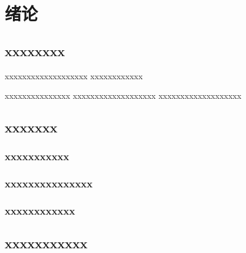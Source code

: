 
\chapter{绪\quad 论}
\section{xxxxxxxx}
xxxxxxxxxxxxxxxxxxx
xxxxxxxxxxxx

xxxxxxxxxxxxxxx
xxxxxxxxxxxxxxxxxxx
xxxxxxxxxxxxxxxxxxx

\section{xxxxxxx}
\subsection{xxxxxxxxxxx}

\subsection{xxxxxxxxxxxxxxx}

\subsection{xxxxxxxxxxxx}

\section{xxxxxxxxxxx}